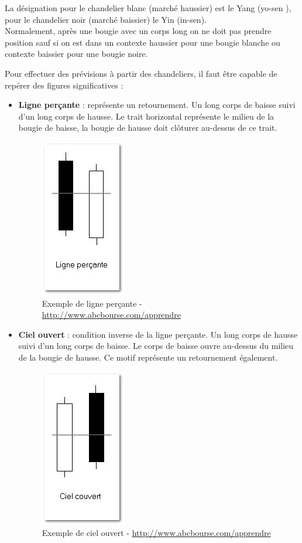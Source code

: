 La désignation pour le chandelier blanc (marché haussier) est le Yang (yo-sen ), pour le chandelier noir (marché baissier) le Yin (in-sen). \\
 
Normalement, après une bougie avec un corps long on ne doit pas prendre position sauf si on est dans un contexte haussier pour une bougie blanche ou contexte baissier pour une bougie noire. 

Pour effectuer des prévisions à partir des chandeliers, il faut être capable de repérer des figures significatives : 
\begin{itemize}
\item  \textbf{Ligne perçante} : représente un retournement. Un long corps de baisse suivi d’un long corps de hausse. Le trait horizontal représente le milieu de la bougie de baisse, la bougie de hausse doit clôturer au-dessus de ce trait.  
\begin{figure}[H]
  \center
  \includegraphics[scale=0.5]{../graph/chandelier1.png}
  \caption{Exemple de ligne perçante - \url{http://www.abcbourse.com/apprendre}}
\end{figure} 

\item \textbf{Ciel ouvert} : condition inverse de la ligne perçante. Un long corps de hausse suivi d’un long corps de baisse. Le corps de baisse ouvre au-dessus du milieu de la bougie de hausse. Ce motif représente un retournement également. 
\begin{figure}[H]
  \center
  \includegraphics[scale=0.5]{../graph/chandelier2.png}
  \caption{Exemple de ciel ouvert - \url{http://www.abcbourse.com/apprendre}}
\end{figure} 


\end{itemize}
